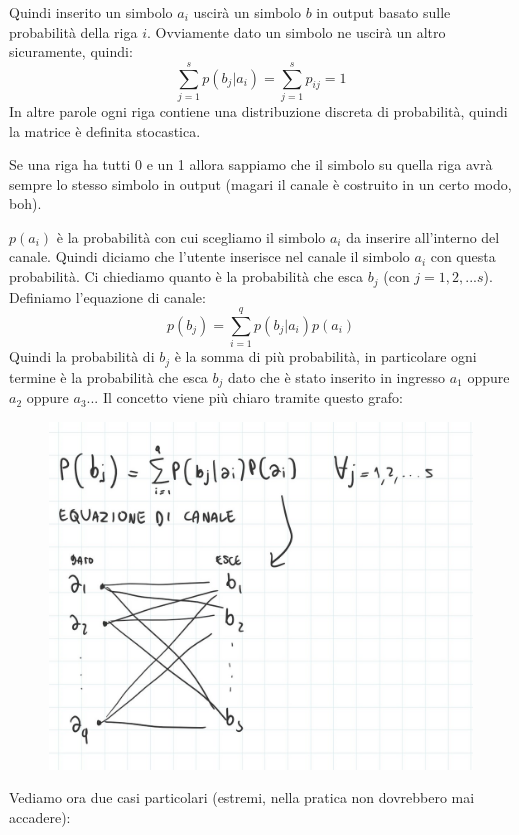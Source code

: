 Quindi inserito un simbolo $a_i$ uscirà un simbolo $b$ in output basato sulle probabilità della riga $i$. Ovviamente dato un simbolo ne uscirà un altro sicuramente, quindi:
\begin{equation*}
\sum_{j=1}^sp(b_j|a_i)=\sum_{j=1}^sp_{ij} = 1
\end{equation*}
In altre parole ogni riga contiene una distribuzione discreta di probabilità, quindi la matrice è definita stocastica.

Se una riga ha tutti 0 e un 1 allora sappiamo che il simbolo su quella riga avrà sempre lo stesso simbolo in output (magari il canale è costruito in un certo modo, boh).

$p(a_i)$ è la probabilità con cui scegliamo il simbolo $a_i$ da inserire all'interno del canale. Quindi diciamo che l'utente inserisce nel canale il simbolo $a_i$ con questa probabilità.
Ci chiediamo quanto è la probabilità che esca $b_j$ (con $j=1,2,...s$).
Definiamo l'equazione di canale:
\begin{equation*}
p(b_j) =\sum_{i=1}^qp(b_j|a_i)p(a_i)
\end{equation*}
Quindi la probabilità di $b_j$ è la somma di più probabilità, in particolare ogni termine è la probabilità che esca $b_j$ dato che è stato inserito in ingresso $a_1$ oppure $a_2$ oppure $a_3$...
Il concetto viene più chiaro tramite questo grafo:
\begin{figure}[h]
	\centering
	\includegraphics[width=0.85\linewidth]{immagini/img28}
\end{figure}

Vediamo ora due casi particolari (estremi, nella pratica non dovrebbero mai accadere):

